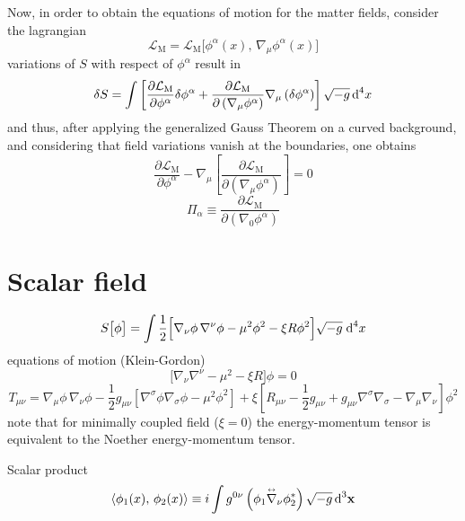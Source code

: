 Now, in order to obtain the equations of motion for the matter fields, consider the lagrangian
\begin{equation}
	\mathcal{L}_{\text{M}}=\mathcal{L}_{\text{M}}\big[\phi^\alpha(x),\,\nabla_\mu\phi^\alpha(x)\big]
\end{equation}
variations of $S$ with respect of $\phi^\alpha$ result in
\begin{equation}
	\delta S=\int\left[\frac{\partial \mathcal{L}_\text{M}}{\partial \phi^\alpha}\delta\phi^\alpha+\frac{\partial \mathcal{L}_\text{M}}{\partial\left(\nabla_\mu\phi^\alpha\right)}\nabla_\mu\left(\delta\phi^\alpha\right)\right]\sqrt{-g}\,\text{d}^4x
\end{equation}
and thus, after applying the generalized Gauss Theorem on a curved background, and considering that field variations vanish at the boundaries, one obtains
\begin{equation}
	\frac{\partial \mathcal{L}_\text{M}}{\partial \phi^\alpha}-\nabla_\mu\left[\frac{\partial \mathcal{L}_\text{M}}{\partial\left(\nabla_\mu\phi^\alpha\right)}\right]=0
\end{equation}
\begin{equation}
	\Pi_\alpha\equiv \frac{\partial\mathcal{L}_\text{M}}{\partial\left(\nabla_0\phi^\alpha\right)}
\end{equation}
\section{Scalar field}
\begin{equation}
	S\big[\phi\big]=\int\frac{1}{2}\Big[\nabla_\nu\phi\,\nabla^\nu\phi-\mu^2\phi^2-\xi R\phi^2\Big]\sqrt{-g}\;\text{d}^4 x
\end{equation}
equations of motion (Klein-Gordon)
\begin{equation}
	\big[\nabla_\nu\nabla^\nu-\mu^2-\xi R\big]\phi=0
\end{equation}
\begin{equation}
	T_{\mu\nu}=\nabla_\mu\phi\,\nabla_\nu\phi -\frac{1}{2}g_{\mu\nu}\left[\nabla^\sigma\phi\nabla_\sigma\phi-\mu^2\phi^2\right]+\xi\left[R_{\mu\nu}-\frac{1}{2}g_{\mu\nu}+g_{\mu\nu}\nabla^\sigma\nabla_\sigma-\nabla_\mu\nabla_\nu\right]\phi^2
\end{equation}
note that for minimally coupled field ($\xi=0$) the energy-momentum tensor is equivalent to the Noether energy-momentum tensor.

Scalar product
\begin{equation}
	\langle \phi_1(x),\,\phi_2(x)\rangle\equiv i\int g^{0\nu}\left(\phi_1\overset{\text{\tiny$\leftrightarrow$}}{\nabla}_\nu\phi_2^*\right)\sqrt{-g}\,\text{d}^3\mathbf{x}
\end{equation}

